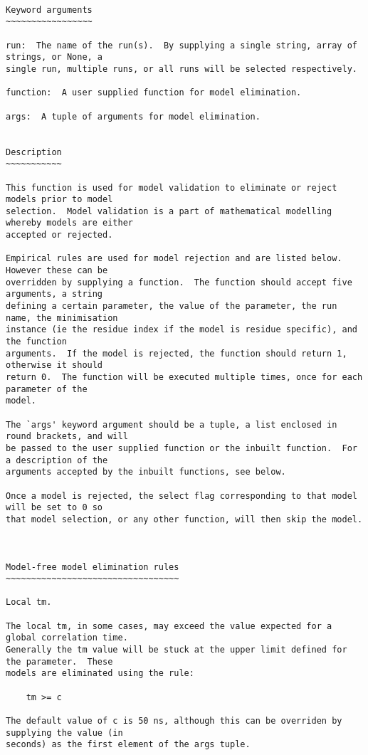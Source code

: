 {\scriptsize
\begin{verbatim}

Keyword arguments
~~~~~~~~~~~~~~~~~

run:  The name of the run(s).  By supplying a single string, array of strings, or None, a
single run, multiple runs, or all runs will be selected respectively.

function:  A user supplied function for model elimination.

args:  A tuple of arguments for model elimination.


Description
~~~~~~~~~~~

This function is used for model validation to eliminate or reject models prior to model
selection.  Model validation is a part of mathematical modelling whereby models are either
accepted or rejected.

Empirical rules are used for model rejection and are listed below.  However these can be
overridden by supplying a function.  The function should accept five arguments, a string
defining a certain parameter, the value of the parameter, the run name, the minimisation
instance (ie the residue index if the model is residue specific), and the function
arguments.  If the model is rejected, the function should return 1, otherwise it should
return 0.  The function will be executed multiple times, once for each parameter of the
model.

The `args' keyword argument should be a tuple, a list enclosed in round brackets, and will
be passed to the user supplied function or the inbuilt function.  For a description of the
arguments accepted by the inbuilt functions, see below.

Once a model is rejected, the select flag corresponding to that model will be set to 0 so
that model selection, or any other function, will then skip the model.



Model-free model elimination rules
~~~~~~~~~~~~~~~~~~~~~~~~~~~~~~~~~~

Local tm.

The local tm, in some cases, may exceed the value expected for a global correlation time.
Generally the tm value will be stuck at the upper limit defined for the parameter.  These
models are eliminated using the rule:

    tm >= c

The default value of c is 50 ns, although this can be overriden by supplying the value (in
seconds) as the first element of the args tuple.



\end{verbatim}}
